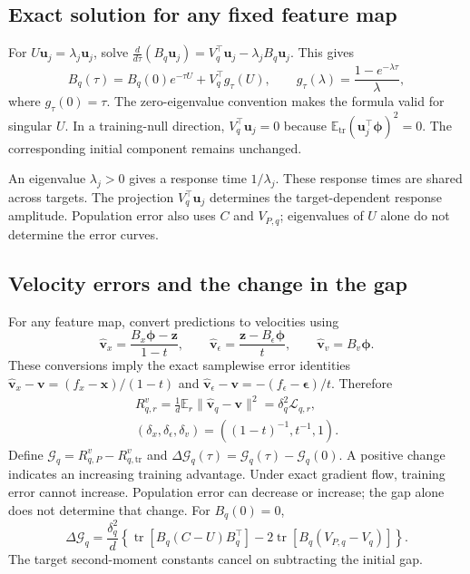 \subsection{Exact solution for any fixed feature map}
For $U\mathbf u_j=\lambda_j\mathbf u_j$, solve
$\frac{d}{d\tau}(B_q\mathbf u_j)
=V_q^\top\mathbf u_j-\lambda_jB_q\mathbf u_j$. This gives
\begin{equation}
 B_q(\tau)=B_q(0)e^{-\tau U}+V_q^\top g_\tau(U),\qquad
 g_\tau(\lambda)=\frac{1-e^{-\lambda\tau}}{\lambda},
 \label{eq:app_readout_solution}
\end{equation}
where $g_\tau(0)=\tau$. The zero-eigenvalue convention makes the formula
valid for singular $U$. In a training-null direction,
$V_q^\top\mathbf u_j=0$ because
$\mathbb E_{\mathrm{tr}}(\mathbf u_j^\top\boldsymbol\phi)^2=0$.
The corresponding initial component remains unchanged.

An eigenvalue $\lambda_j>0$ gives a response time $1/\lambda_j$.
These response times are shared across targets. The projection
$V_q^\top\mathbf u_j$ determines the target-dependent response amplitude.
Population error also uses $C$ and $V_{P,q}$; eigenvalues of $U$ alone
do not determine the error curves.

\subsection{Velocity errors and the change in the gap}
For any feature map, convert predictions to velocities using
\[
 \widehat{\mathbf v}_x=\frac{B_x\boldsymbol\phi-\mathbf z}{1-t},\qquad
 \widehat{\mathbf v}_\epsilon=\frac{\mathbf z-B_\epsilon\boldsymbol\phi}{t},
 \qquad \widehat{\mathbf v}_v=B_v\boldsymbol\phi.
\]
These conversions imply the exact samplewise error identities
$\widehat{\mathbf v}_x-\mathbf v=(f_x-\mathbf x)/(1-t)$ and
$\widehat{\mathbf v}_\epsilon-\mathbf v
=-(f_\epsilon-\boldsymbol\epsilon)/t$.
Therefore
\begin{gather*}
 R^v_{q,r}=\frac1d\mathbb E_r\|\widehat{\mathbf v}_q-\mathbf v\|^2
 =\delta_q^2\mathcal L_{q,r},\\
 (\delta_x,\delta_\epsilon,\delta_v)=((1-t)^{-1},t^{-1},1).
\end{gather*}
Define $\mathcal G_q=R^v_{q,P}-R^v_{q,\mathrm{tr}}$ and
$\Delta\mathcal G_q(\tau)=\mathcal G_q(\tau)-\mathcal G_q(0)$.
A positive change indicates an increasing training advantage.
Under exact gradient flow, training error cannot increase.
Population error can decrease or increase; the gap alone does not determine
that change.
For $B_q(0)=0$,
\begin{equation}
 \Delta\mathcal G_q
 =\frac{\delta_q^2}{d}\left\{
 \operatorname{tr}[B_q(C-U)B_q^\top]
 -2\operatorname{tr}[B_q(V_{P,q}-V_q)]\right\}.
 \label{eq:app_native_gap}
\end{equation}
The target second-moment constants cancel on subtracting the initial gap.

